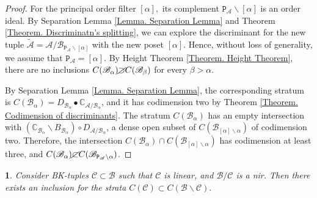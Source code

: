\documentclass[11pt]{article}
\theoremstyle{plain}
\theoremstyle{definition}
\theoremstyle{remark}
\theoremstyle{plain}
\newtheorem{lem}[thm]{\protect\lemmaname}
\theoremstyle{plain}
\theoremstyle{plain}
\theoremstyle{definition}
\providecommand{\lemmaname}{Lemma}
\begin{document}
\begin{proof}
For the principal order filter $[\alpha],$ its complement $\mathtt{P}_{\mathscr{A}}\backslash[\alpha]$
is an order ideal. By Separation Lemma \ref{Lemma. Separation Lemma}
and Theorem \ref{Theorem. Discriminatn's splitting}, we can explore
the discriminant for the new tuple $\tilde{\mathscr{A}}=\mathscr{A}/\mathscr{B}_{\mathtt{P}_{\mathscr{A}}\backslash[\alpha]}$
with the new poset $[\alpha].$ Hence, without loss of generality,
we assume that $\mathtt{P}_{\mathscr{A}}=[\alpha].$ By Height Theorem
\ref{Theorem. Height Theorem}, there are no inclusions $C(\mathscr{B}_{\alpha})\cancel{\supset}C(\mathscr{B}_{\beta})$
for every $\beta>\alpha.$ 

By Separation Lemma \ref{Lemma. Separation Lemma}, the corresponding
stratum is $C(\mathscr{B}_{\alpha})=D_{\mathscr{B}_{\alpha}}\bullet\mathbb{C}_{\mathscr{A}/\mathscr{B}_{\alpha}}$,
and it has codimension two by Theorem \ref{Theorem. Codimension of discriminants}.
The stratum $C(\mathscr{B}_{\alpha})$ has an empty intersection with
$(\mathbb{C}_{\mathscr{B}_{\alpha}}\backslash B_{\mathscr{B}_{\alpha}})\circ D_{\mathscr{A}/\mathscr{B}_{\alpha}}$,
a dense open subset of $C(\mathscr{B}_{[\alpha]\backslash\alpha})$
of codimension two. Therefore, the intersection $C(\mathscr{B}_{\alpha})\cap C(\mathscr{B}_{[\alpha]\backslash\alpha})$
has codimension at least three, and $C(\mathscr{B}_{\alpha})\cancel{\subset}C(\mathscr{B}_{\mathtt{P}_{\mathscr{A}}\backslash\alpha})$.
\end{proof}
\begin{lem}
\label{Lemma. If the upper filer consists of linear tuples then strata codim2 lies in codim1}Consider
BK-tuples $\mathscr{C}\subset\mathscr{B}$ such that $\mathscr{C}$
is linear, and $\mathscr{B}/\mathscr{C}$ is a nir. Then there exists
an inclusion for the strata $C(\mathscr{C})\subset C(\mathscr{B}\backslash\mathscr{C}).$
\end{lem}
\end{document}

